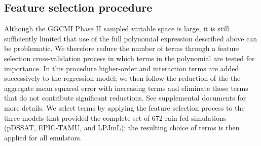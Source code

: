 \documentclass[preprint, 5p, times, twocolumn]{elsarticle}
\begin{document}

\subsection{Feature selection procedure}
Although the GGCMI Phase II sampled variable space is large, it is still sufficiently limited that use of the full polynomial expression described above can be problematic. We therefore reduce the number of terms through a feature selection cross-validation process in which terms in the polynomial are tested for importance. In this procedure higher-order and interaction terms are added successively to the regression model; we then follow the reduction of the the aggregate mean squared error with increasing terms and eliminate those terms that do not contribute significant reductions. See supplemental documents for more details. We select terms by applying the feature selection process to the three models that provided the complete set of 672 rain-fed simulations (pDSSAT, EPIC-TAMU, and LPJmL); the resulting choice of terms is then applied for all emulators. 
\end{document}
